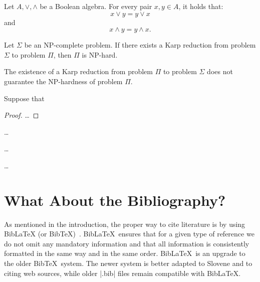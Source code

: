 \documentclass[9pt]{style/friteza}
\begin{document}
\begin{axiom}
Let ${A, \vee, \wedge}$ be a Boolean algebra.
For every pair $x, y \in A$, it holds that: \[x \vee y = y \vee x\] and \[x \wedge y = y \wedge x.\]
\end{axiom}

\begin{proposition}
Let $\Sigma$ be an NP-complete problem.
If there exists a Karp reduction from problem $\Sigma$ to problem $\Pi$, then $\Pi$ is NP-hard.
\end{proposition}

\begin{remark}
The existence of a Karp reduction from problem $\Pi$ to problem $\Sigma$ does not guarantee the NP-hardness of problem $\Pi$.
\end{remark}

\begin{theorem}
Suppose that
\end{theorem}

\begin{proof}
\dots
\end{proof}

\begin{corollary}
\dots
\end{corollary}

\begin{lemma}
\dots
\end{lemma}

\begin{example}
\dots
\end{example}


\section{What About the Bibliography?}
\label{sec:lit}

As mentioned in the introduction, the proper way to cite literature is by using Bib\LaTeX{} (or Bib\TeX)~\cite{biblatex}.
Bib\LaTeX\ ensures that for a given type of reference we do not omit
any mandatory information
and that all information is consistently formatted in the same way and in the same order.
Bib\LaTeX\ is an upgrade to the older Bib\TeX\ system. The newer system is better adapted to Slovene and to citing web sources, while older \ltx|.bib| files remain compatible with Bib\LaTeX.
\end{document}

